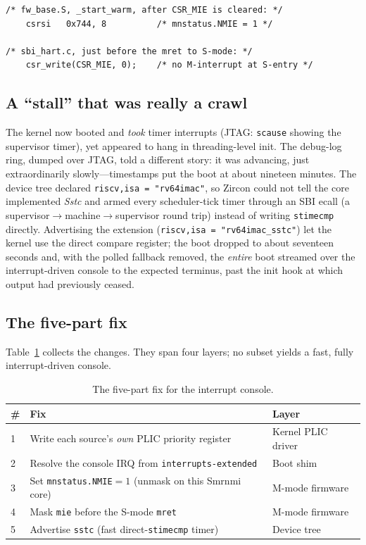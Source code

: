 \documentclass[conference,nofonttune]{IEEEtran}
\newcommand{\code}[1]{\texttt{#1}}
\newcommand{\reg}[1]{\texttt{#1}}
\begin{document}
\begin{lstlisting}[caption={The two coupled firmware changes.},label={lst:fw}]
/* fw_base.S, _start_warm, after CSR_MIE is cleared: */
    csrsi   0x744, 8          /* mnstatus.NMIE = 1 */

/* sbi_hart.c, just before the mret to S-mode: */
    csr_write(CSR_MIE, 0);    /* no M-interrupt at S-entry */
\end{lstlisting}

\subsection{A ``stall'' that was really a crawl}
The kernel now booted and \emph{took} timer interrupts (JTAG: \reg{scause} showing
the supervisor timer), yet appeared to hang in threading-level init. The
debug-log ring, dumped over JTAG, told a different story: it was advancing, just
extraordinarily slowly---timestamps put the boot at about nineteen minutes. The
device tree declared \code{riscv,isa = "rv64imac"}, so Zircon could not tell the
core implemented \emph{Sstc} and armed every scheduler-tick timer through an SBI
ecall (a supervisor$\rightarrow$machine$\rightarrow$supervisor round trip) instead
of writing \reg{stimecmp} directly. Advertising the extension
(\code{riscv,isa = "rv64imac\_sstc"}) let the kernel use the direct compare
register; the boot dropped to about seventeen seconds and, with the polled
fallback removed, the \emph{entire} boot streamed over the interrupt-driven
console to the expected terminus, past the init hook at which output had
previously ceased.

\subsection{The five-part fix}
Table~\ref{tab:fixes} collects the changes. They span four layers; no subset
yields a fast, fully interrupt-driven console.

\begin{table}[t]
\caption{The five-part fix for the interrupt console.}
\label{tab:fixes}
\centering
\footnotesize
\begin{tabular}{@{}p{}p{}p{}@{}}
\toprule
\# & Fix & Layer \\
\midrule
1 & Write each source's \emph{own} PLIC priority register & Kernel PLIC driver \\
2 & Resolve the console IRQ from \code{interrupts-extended} & Boot shim \\
3 & Set \reg{mnstatus.NMIE}${=}1$ (unmask on this Smrnmi core) & M-mode firmware \\
4 & Mask \reg{mie} before the S-mode \code{mret} & M-mode firmware \\
5 & Advertise \code{sstc} (fast direct-\reg{stimecmp} timer) & Device tree \\
\bottomrule
\end{tabular}
\end{table}
\end{document}
